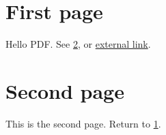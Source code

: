 \documentclass{article}
\begin{document}
\section{First page}\label{sec:first}
Hello PDF. See \ref{sec:second}, or \href{https://example.com}{external link}.
\newpage
\section{Second page}\label{sec:second}
This is the second page. Return to \ref{sec:first}.
\end{document}
